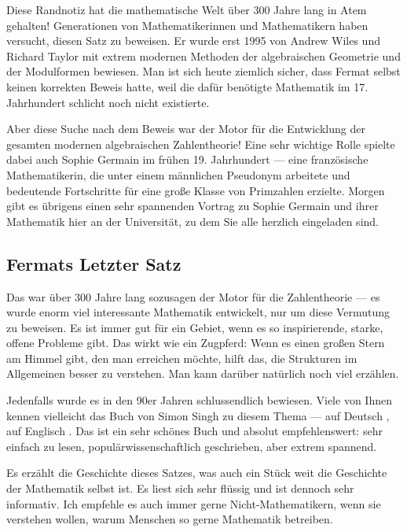 \begin{spoken-clean}[00:51:56 - 00:54:26]
Diese Randnotiz hat die mathematische Welt über 300 Jahre lang in Atem gehalten! Generationen von Mathematikerinnen und Mathematikern haben versucht, diesen Satz zu beweisen. Er wurde erst 1995 von Andrew Wiles und Richard Taylor mit extrem modernen Methoden der algebraischen Geometrie und der Modulformen bewiesen. Man ist sich heute ziemlich sicher, dass Fermat selbst keinen korrekten Beweis hatte, weil die dafür benötigte Mathematik im 17. Jahrhundert schlicht noch nicht existierte.

Aber diese Suche nach dem Beweis war der Motor für die Entwicklung der gesamten modernen algebraischen Zahlentheorie! Eine sehr wichtige Rolle spielte dabei auch Sophie Germain im frühen 19. Jahrhundert --- eine französische Mathematikerin, die unter einem männlichen Pseudonym arbeitete und bedeutende Fortschritte für eine große Klasse von Primzahlen erzielte. Morgen gibt es übrigens einen sehr spannenden Vortrag zu Sophie Germain und ihrer Mathematik hier an der Universität, zu dem Sie alle herzlich eingeladen sind.
\end{spoken-clean}

\subsection{Fermats Letzter Satz}

\begin{spoken-clean}[00:55:32 - 00:57:02]
Das war über 300 Jahre lang sozusagen der Motor für die Zahlentheorie --- es wurde enorm viel interessante Mathematik entwickelt, nur um diese Vermutung zu beweisen. Es ist immer gut für ein Gebiet, wenn es so inspirierende, starke, offene Probleme gibt. Das wirkt wie ein Zugpferd: Wenn es einen großen Stern am Himmel gibt, den man erreichen möchte, hilft das, die Strukturen im Allgemeinen besser zu verstehen. Man kann darüber natürlich noch viel erzählen.

Jedenfalls wurde es in den 90er Jahren schlussendlich bewiesen. Viele von Ihnen kennen vielleicht das Buch von Simon Singh zu diesem Thema --- auf Deutsch , auf Englisch . Das ist ein sehr schönes Buch und absolut empfehlenswert: sehr einfach zu lesen, populärwissenschaftlich geschrieben, aber extrem spannend.

Es erzählt  die Geschichte dieses Satzes, was auch ein Stück weit die Geschichte der Mathematik selbst ist. Es liest sich sehr flüssig und ist dennoch sehr informativ. Ich empfehle es auch immer gerne Nicht-Mathematikern, wenn sie verstehen wollen, warum Menschen so gerne Mathematik betreiben.
\end{spoken-clean}

